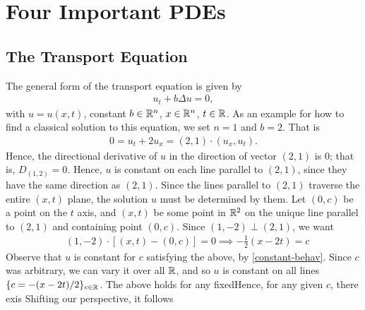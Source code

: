 \chapter{Four Important PDEs}
\section{The Transport Equation}
The general form of the transport equation is given by
\begin{equation*}
\begin{split}
	u_{t}  + b\Delta u = 0,
\end{split}
\end{equation*}
with $u = u(x,t)$, constant $b \in \mathbb{R}^n$, $x \in \mathbb{R}^{n}$, $t \in \mathbb{R}$.
As an example for how to find a classical solution to this equation, we set
$n = 1$ and $b=2$. That is
\begin{equation}
	\label{constant-behav}
\begin{split}
	0 = u_{t} + 2 u _{x} = (2,1) \cdot (u_{x}, u_{t}).
\end{split}
\end{equation}
Hence, the directional derivative of $u$ in the direction of vector $(2,1)$ is
0; that is, $D_{(1,2)} = 0$. Hence, $u$ is constant on each line parallel to
$(2,1)$, since they have the same direction as $(2,1)$. Since the lines parallel
to $(2,1)$ traverse the entire $(x,t)$ plane, the solution $u$ must be
determined by them. Let $(0,c)$ be a point on the $t$ axis, and $(x,t)$ be some
point in $\mathbb{R}^{2}$ on the unique line parallel to $(2,1)$ and containing point
$(0,c)$. Since $(1,-2) \perp (2,1)$, we want
\begin{equation*}
\begin{split}
	& (1,-2) \cdot \left[ (x,t) - (0,c) \right] = 0
	\implies -\frac{1}{2}(x-2t) = c
\end{split}
\end{equation*}
Observe that $u$ is constant for $c$ satisfying the above, by
\eqref{constant-behav}. Since $c$ was arbitrary, we can vary it over all $\mathbb{R}$,
and so $u$ is constant on all lines $\{ c = -(x-2t)/2\}_{c \in \mathbb{R}}$. The above holds for any fixedHence, for any given $c$, there exis Shifting our perspective, it follows 

